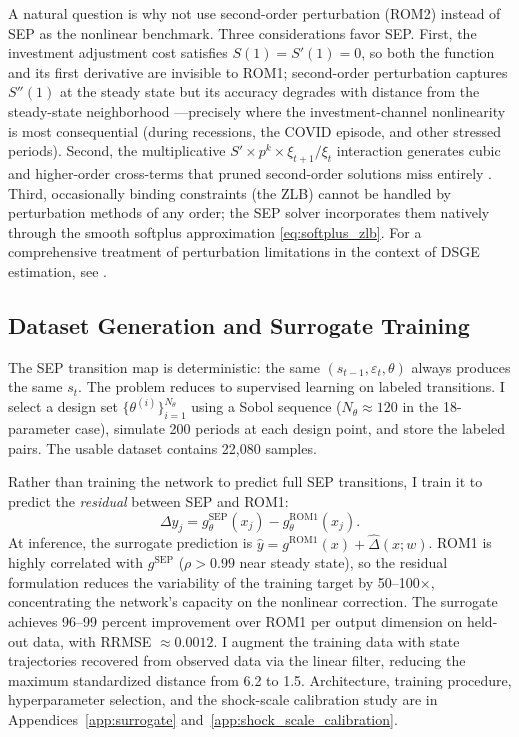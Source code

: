 \documentclass[12pt]{article}
\theoremstyle{plain}
\theoremstyle{definition}
\theoremstyle{remark}
\newcommand{\eps}{\varepsilon}
\begin{document}
A natural question is why not use second-order perturbation (ROM2) instead of SEP as the nonlinear benchmark. Three considerations favor SEP. First, the investment adjustment cost satisfies $S(1) = S'(1) = 0$, so both the function and its first derivative are invisible to ROM1; second-order perturbation captures $S''(1)$ at the steady state but its accuracy degrades with distance from the steady-state neighborhood \citep{aruoba2006comparing,kimetal2008pruning}---precisely where the investment-channel nonlinearity is most consequential (during recessions, the COVID episode, and other stressed periods). Second, the multiplicative $S' \times p^k \times \xi_{t+1}/\xi_t$ interaction generates cubic and higher-order cross-terms that pruned second-order solutions miss entirely \citep{andreasen2018pruning}. Third, occasionally binding constraints (the ZLB) cannot be handled by perturbation methods of any order; the SEP solver incorporates them natively through the smooth softplus approximation \eqref{eq:softplus_zlb}. For a comprehensive treatment of perturbation limitations in the context of DSGE estimation, see \citet{fernandez2016solution}.


\subsection{Dataset Generation and Surrogate Training}
\label{subsec:surrogate}

The SEP transition map is deterministic: the same $(s_{t-1},\eps_t,\theta)$ always produces the same $s_t$. The problem reduces to supervised learning on labeled transitions. I select a design set $\{\theta^{(i)}\}_{i=1}^{N_\theta}$ using a Sobol sequence ($N_\theta \approx 120$ in the 18-parameter case), simulate 200 periods at each design point, and store the labeled pairs. The usable dataset contains 22,080 samples.

Rather than training the network to predict full SEP transitions, I train it to predict the \textit{residual} between SEP and ROM1:
\begin{equation*}
\Delta y_j = g_\theta^{\text{SEP}}(x_j) - g_\theta^{\text{ROM1}}(x_j).
\end{equation*}
At inference, the surrogate prediction is $\hat{y} = g^{\text{ROM1}}(x) + \hat{\Delta}(x; w)$. ROM1 is highly correlated with $g^{\text{SEP}}$ ($\rho > 0.99$ near steady state), so the residual formulation reduces the variability of the training target by 50--100$\times$, concentrating the network's capacity on the nonlinear correction. The surrogate achieves 96--99 percent improvement over ROM1 per output dimension on held-out data, with RRMSE $\approx 0.0012$. I augment the training data with state trajectories recovered from observed data via the linear filter, reducing the maximum standardized distance from 6.2 to 1.5. Architecture, training procedure, hyperparameter selection, and the shock-scale calibration study are in Appendices~\ref{app:surrogate} and~\ref{app:shock_scale_calibration}.
\end{document}
